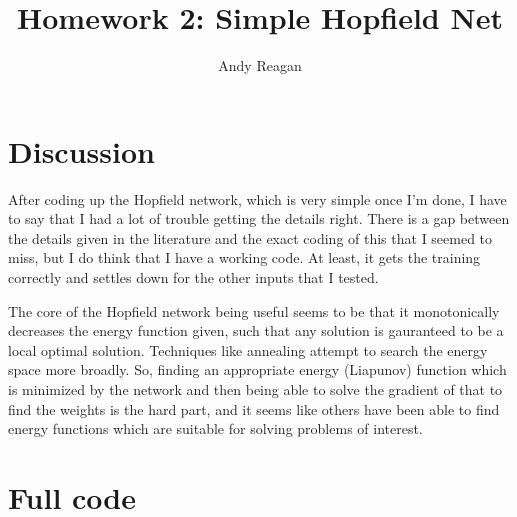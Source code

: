 \documentclass{article}
\begin{document}
\title{\vspace{-2cm}Homework 2: Simple Hopfield Net}
\author{Andy Reagan}

\maketitle

\section{Discussion}

After coding up the Hopfield network, which is very simple once I'm done, I have to say that I had a lot of trouble getting the details right.
There is a gap between the details given in the literature and the exact coding of this that I seemed to miss, but I do think that I have a working code.
At least, it gets the training correctly and settles down for the other inputs that I tested.

The core of the Hopfield network being useful seems to be that it monotonically decreases the energy function given, such that any solution is gauranteed to be a local optimal solution.
Techniques like annealing attempt to search the energy space more broadly.
So, finding an appropriate energy (Liapunov) function which is minimized by the network and then being able to solve the gradient of that to find the weights is the hard part, and it seems like others have been able to find energy functions which are suitable for solving problems of interest.



\clearpage
\pagebreak

\section*{Full code}


\end{document}
